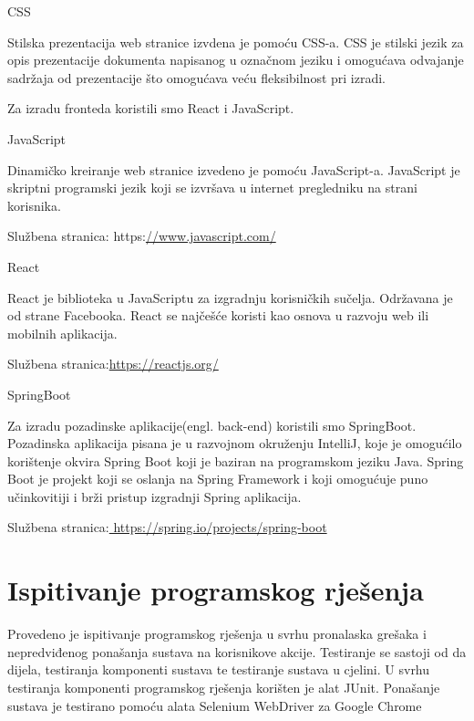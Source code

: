 CSS

Stilska prezentacija web stranice izvdena je pomoću CSS-a.
CSS je stilski jezik za opis prezentacije dokumenta napisanog u označnom jeziku i omogućava odvajanje sadržaja od prezentacije što omogućava veću fleksibilnost pri izradi. 

\vspace{8mm}
Za izradu fronteda koristili smo React i JavaScript. 
\vspace{4mm}

JavaScript

Dinamičko kreiranje web stranice izvedeno je pomoću JavaScript-a. JavaScript je skriptni programski jezik koji se izvršava u internet pregledniku
na strani korisnika.

Službena stranica: https:\url{//www.javascript.com/}
\vspace{3mm}

React

React je biblioteka u JavaScriptu za izgradnju korisničkih sučelja. Održavana je od strane Facebooka. 
React se najčešće koristi kao osnova u razvoju web ili mobilnih aplikacija. 

Službena stranica:\url{https://reactjs.org/}
\vspace{3mm}

SpringBoot

Za izradu pozadinske aplikacije(engl. back-end) koristili smo SpringBoot. Pozadinska aplikacija pisana je u razvojnom okruženju IntelliJ, koje je
omogućilo korištenje okvira Spring Boot koji je baziran na programskom jeziku Java. Spring Boot je projekt koji se oslanja na Spring Framework i koji omogućuje puno učinkovitiji i brži pristup izgradnji Spring aplikacija.

Službena stranica:\url{ https://spring.io/projects/spring-boot}
\vspace{5mm}

			
			
			\eject 
			

	
		\section{Ispitivanje programskog rješenja}
			
		Provedeno je ispitivanje programskog rješenja u svrhu pronalaska grešaka i nepredviđenog ponašanja sustava na korisnikove akcije. Testiranje se sastoji od da dijela, testiranja komponenti sustava te testiranje sustava u cjelini. U svrhu testiranja komponenti programskog rješenja korišten je alat JUnit. Ponašanje sustava je testirano pomoću alata Selenium WebDriver za Google Chrome
			
